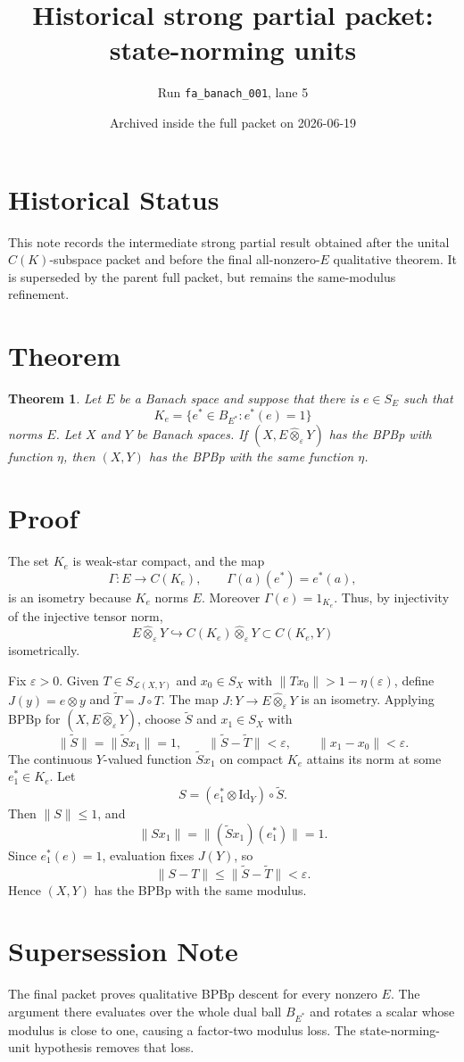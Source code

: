 \documentclass[11pt]{article}
\title{Historical strong partial packet: state-norming units}
\author{Run \texttt{fa\_banach\_001}, lane 5}
\date{Archived inside the full packet on 2026-06-19}
\newtheorem{theorem}{Theorem}
\newcommand{\ot}{\widehat{\otimes}_{\varepsilon}}
\begin{document}
\maketitle

\section*{Historical Status}

This note records the intermediate strong partial result obtained after the
unital \(C(K)\)-subspace packet and before the final all-nonzero-\(E\)
qualitative theorem.  It is superseded by the parent full packet, but remains
the same-modulus refinement.

\section*{Theorem}

\begin{theorem}
Let \(E\) be a Banach space and suppose that there is \(e\in S_E\) such that
\[
 K_e=\{e^\ast\in B_{E^\ast}: e^\ast(e)=1\}
\]
norms \(E\).  Let \(X\) and \(Y\) be Banach spaces.  If \((X,E\ot Y)\) has the
BPBp with function \(\eta\), then \((X,Y)\) has the BPBp with the same function
\(\eta\).
\end{theorem}

\section*{Proof}

The set \(K_e\) is weak-star compact, and the map
\[
 \Gamma:E\to C(K_e),\qquad \Gamma(a)(e^\ast)=e^\ast(a),
\]
is an isometry because \(K_e\) norms \(E\).  Moreover \(\Gamma(e)=1_{K_e}\).
Thus, by injectivity of the injective tensor norm,
\[
 E\ot Y\hookrightarrow C(K_e)\ot Y\subset C(K_e,Y)
\]
isometrically.

Fix \(\varepsilon>0\).  Given \(T\in S_{\mathcal L(X,Y)}\) and \(x_0\in S_X\)
with \(\|Tx_0\|>1-\eta(\varepsilon)\), define \(J(y)=e\otimes y\) and
\(\widetilde T=J\circ T\).  The map \(J:Y\to E\ot Y\) is an isometry.
Applying BPBp for \((X,E\ot Y)\), choose \(\widetilde S\) and \(x_1\in S_X\)
with
\[
 \|\widetilde S\|=\|\widetilde Sx_1\|=1,\qquad
 \|\widetilde S-\widetilde T\|<\varepsilon,\qquad
 \|x_1-x_0\|<\varepsilon .
\]
The continuous \(Y\)-valued function \(\widetilde Sx_1\) on compact \(K_e\)
attains its norm at some \(e_1^\ast\in K_e\).  Let
\[
 S=(e_1^\ast\otimes \mathrm{Id}_Y)\circ \widetilde S.
\]
Then \(\|S\|\leq 1\), and
\[
 \|Sx_1\|=\|(\widetilde Sx_1)(e_1^\ast)\|=1.
\]
Since \(e_1^\ast(e)=1\), evaluation fixes \(J(Y)\), so
\[
 \|S-T\|\leq\|\widetilde S-\widetilde T\|<\varepsilon .
\]
Hence \((X,Y)\) has the BPBp with the same modulus.

\section*{Supersession Note}

The final packet proves qualitative BPBp descent for every nonzero \(E\).  The
argument there evaluates over the whole dual ball \(B_{E^\ast}\) and rotates a
scalar whose modulus is close to one, causing a factor-two modulus loss.  The
state-norming-unit hypothesis removes that loss.
\end{document}
